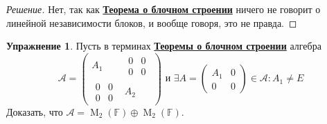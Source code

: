 \documentclass[a4paper, 14pt]{extarticle}
\theoremstyle{definition}
\newtheorem{exec}{Упражнение}
\begin{document}
\begin{proof}[Решение]
	Нет, так как \hyperref[th3_1]{\textbf{Теорема о блочном строении}} ничего не говорит о линейной независимости блоков, и вообще говоря, это не правда.
\end{proof}

\begin{exec}
	Пусть в терминах \hyperref[th3_1]{\textbf{Теоремы о блочном строении}} алгебра
	\[\mathcal{A} = \left( 
		\begin{array}{c|c}
			A_1 & \begin{array}{cc}
				0&0\\
				0&0
			\end{array} \\
			\hline
			\begin{array}{cc}
				0&0\\
				0&0
			\end{array} & A_2
		\end{array}
	\right) \text{ и } \exists A = \left(
		\begin{array}{c|c}
			A_1 & 0 \\
			\hline
			0 & 0
		\end{array}
	\right) \in \mathcal{A} : A_1 \neq E\]
	Доказать, что \(\mathcal{A} = \operatorname{M}_2(\mathbb{F}) \oplus \operatorname{M}_2(\mathbb{F})\).
\end{exec}
\end{document}
